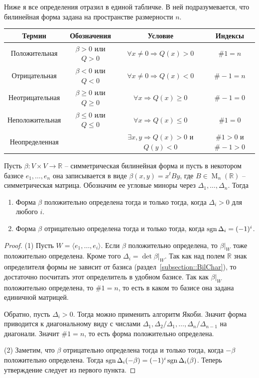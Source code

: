Ниже я все определения отразил в единой табличке.
В ней подразумевается, что билинейная форма задана на пространстве размерности $n$.
\begin{center}
\begin{tabular}{|c|c|c|c|}
\hline
{\bf Термин}&{\bf Обозначения}&{\bf Условие}&{\bf Индексы}\\
\hline
{Положительная}&{$\beta>0$ или $Q>0$}&{$\forall x\neq 0\Rightarrow Q(x) > 0$}&{$\# 1 = n$}\\
\hline
{Отрицательная}&{$\beta<0$ или $Q<0$}&{$\forall x\neq 0\Rightarrow Q(x) < 0$}&{$\#-1 = n$}\\
\hline
{Неотрицательная}&{$\beta\geqslant0$ или $Q\geqslant0$}&{$\forall x\Rightarrow Q(x) \geqslant 0$}&{$\#-1 = 0$}\\
\hline
{Неположительная}&{$\beta\leqslant0$ или $Q\leqslant0$}&{$\forall x\Rightarrow Q(x) \leqslant 0$}&{$\#1 = 0$}\\
\hline
{Неопределенная}&{}&{$\exists x, y\Rightarrow Q(x) > 0$ и $Q(y)<0$}&{$\#1>0$ и $\#-1>0$}\\
\hline
\end{tabular}
\end{center}

\begin{claim}
\label{claim::SilvCrit}
Пусть $\beta\colon V\times V\to \mathbb R$ -- симметрическая билинейная форма и пусть в некотором базисе $e_1,\ldots,e_n$ она записывается в виде $\beta(x, y) = x^t B y$, где $B\in \operatorname{M}_n(\mathbb R)$ -- симметрическая матрица.
Обозначим ее угловые миноры через $\Delta_1,\ldots,\Delta_n$.
Тогда
\begin{enumerate}
\item Форма $\beta$ положительно определена тогда и только тогда, когда $\Delta_i > 0$ для любого $i$.

\item Форма $\beta$ отрицательно определена тогда и только тогда, когда $\operatorname{sgn} \Delta_i = (-1)^i$.
\end{enumerate}
\end{claim}
\begin{proof}
(1) Пусть $W = \langle e_1,\ldots,e_i\rangle$.
Если $\beta$ положительно определена, то $\beta|_W$ тоже положительно определена.
Кроме того $\Delta_i = \det \beta|_W$.
Так как над полем $\mathbb R$ знак определителя формы не зависит от базиса (раздел~\ref{subsection::BilChar}), то достаточно посчитать этот определитель в удобном базисе.
Так как $\beta|_W$ положительно определена, то $\#1 = n$, то есть в каком то базисе она задана единичной матрицей.

Обратно, пусть $\Delta_i > 0$.
Тогда можно применить алгоритм Якоби.
Значит форма приводится к диагональному виду с числами $\Delta_1, \Delta_2/\Delta_1,\ldots,\Delta_n/\Delta_{n-1}$ на диагонали.
Значит $\#1 = n$, то есть форма положительно определена.

(2) Заметим, что $\beta$ отрицательно определена тогда и только тогда, когда $-\beta$ положительно определена.
Тогда $\operatorname{sgn}\Delta_i(-\beta) = (-1)^i\operatorname{sgn}\Delta_i(\beta)$.
Теперь утверждение следует из первого пункта.
\end{proof}

